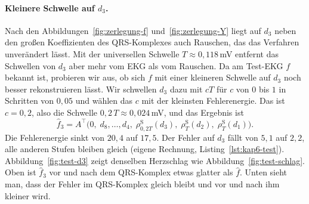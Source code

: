 \documentclass[a4paper,11pt,bibliography=totoc,listof=totoc,headinclude=true,cleardoublepage=empty,oneside]{scrbook}
\theoremstyle{plain}
\theoremstyle{definition}
\begin{document}
\paragraph{Kleinere Schwelle auf $d_3$.}
Nach den Abbildungen~\ref{fig:zerlegung-f} und~\ref{fig:zerlegung-Y} liegt
auf $d_3$ neben den gro\ss en Koeffizienten des QRS-Komplexes auch Rauschen,
das das Verfahren unverändert lässt. Mit der universellen Schwelle
$T \approx 0{,}118$\,mV entfernt das Schwellen von $d_3$ aber mehr vom EKG
als vom Rauschen. Da am Test-EKG $f$
bekannt ist, probieren wir aus, ob sich $f$ mit einer kleineren Schwelle auf
$d_3$ noch besser rekonstruieren lässt. Wir schwellen $d_3$ dazu mit $cT$ für 
$c$ von $0$ bis $1$ in Schritten von $0{,}05$ und wählen das $c$ mit der
kleinsten Fehlerenergie. Das ist $c = 0{,}2$, also die Schwelle 
$0{,}2\,T \approx 0{,}024$\,mV, und das Ergebnis ist
\[ 
  \hat f_3 = A^\top\bigl(0,\; d_8, \dots, d_4,\;
  \rho^{\mathrm S}_{0{,}2T}(d_3),\; \rho^{\mathrm S}_T(d_2),\;
  \rho^{\mathrm S}_T(d_1)\bigr).
\]
Die Fehlerenergie sinkt von $20{,}4$ auf $17{,}5$. Der Fehler auf $d_3$ fällt
von $5{,}1$ auf $2{,}2$, alle anderen Stufen bleiben gleich (eigene Rechnung,
Listing~\ref{lst:kap6-test}). Abbildung~\ref{fig:test-d3} zeigt denselben
Herzschlag wie Abbildung~\ref{fig:test-schlag}. Oben ist $\hat f_3$ vor und
nach dem QRS-Komplex etwas glatter als $\hat f$. Unten sieht man, dass der 
Fehler im QRS-Komplex gleich bleibt und vor und nach ihm kleiner wird.
\end{document}
